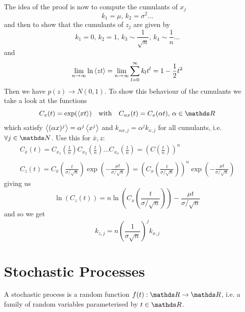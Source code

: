\documentclass{/home/ben/Templates/notebook}
\begin{document}
	The idea of the proof is now to compute the cumulants of $x_j$
	\begin{equation}
	k_1 = \mu, \, k_2 = \sigma^2 \dots
	\end{equation}
	and then to show that the cumulants of $z_j$ are given by
	\begin{equation}
	k_1 = 0, \, k_2 = 1, \, k_3 \sim \frac{1}{\sqrt{n}}, \, k_4 \sim \frac{1}{n} \dots
	\end{equation}
	and
	\begin{equation}
	\lim_{n \to \infty} \ln \expval{zt} = \lim_{n \to \infty} \sum_{l=0}^{\infty} k_l t^l = 1 - \frac{1}{2} t^2 
	\end{equation}
	Then we have $p(z) \to N(0,1)$. To show this behaviour of the cumulants we take a look at the functions
	\begin{equation}
	C_x(t) = \exp(\expval{xt}) \quad \mathrm{with} \quad C_{\alpha x}(t) = C_x(\alpha t), \, \alpha \in \R
	\end{equation}
	which satisfy $\expval{(\alpha x)^j} = \alpha^j \expval{x^j}$ and $k_{\alpha x, j} = \alpha^j k_{x,j}$ for all cumulants, i.e. $\forall j \in \N$. Use this for $\bar{x}, z$:
	\begin{gather*}
		C_{\bar{x}}(t) = C_{x_1}\left( \frac{t}{n} \right) C_{x_2}\left( \frac{t}{n} \right) \dots C_{x_n}\left( \frac{t}{n} \right) = \left(C\left( \frac{t}{n} \right) \right)^n  \\ \\
		C_z(t) = C_{\bar{x}} \left( \frac{t}{\sigma/\sqrt{n}} \right) \exp(-\frac{\mu t}{\sigma/\sqrt{n}}) = \left( C_x \left( \frac{t}{\sigma/\sqrt{n}} \right) \right)^n  \exp(-\frac{\mu t}{\sigma/\sqrt{n}})
	\end{gather*}
	giving us
	\begin{equation}
	\ln(C_z(t)) = n \ln(C_x \left( \frac{t}{\sigma/\sqrt{n}} \right)) - \frac{\mu t}{\sigma/\sqrt{n}}
	\end{equation}
	and so we get
	\begin{equation}
	k_{z,j} = n \left( \frac{1}{\sigma \sqrt{n}} \right)^j k_{x,j}
	\end{equation}
	
	
	\newpage
	\section{Stochastic Processes}
	
	\begin{theorem}
		A stochastic process is a random function $f(t):\R \to \R$, i.e. a family of random variables parameterised by $t \in \R$.
	\end{theorem}
	
\end{document}

